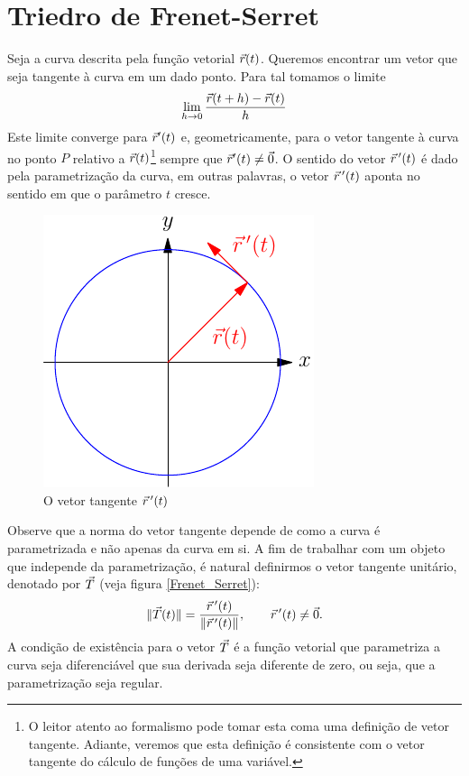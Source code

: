 \section{Triedro de Frenet-Serret}

Seja a curva descrita pela função vetorial $\vec{r}(t)$. Queremos encontrar um vetor que seja tangente à curva em um dado ponto. Para tal tomamos o limite
$$\lim_{h\to 0} \frac{\vec{r}(t+h)-\vec{r}(t)}{h}$$  
Este limite converge para $\vec{r}'(t)$ e, geometricamente, para o vetor tangente à curva no ponto $P$ relativo a $\vec{r}(t)$\footnote{O leitor atento ao formalismo pode tomar esta coma uma definição de vetor tangente. Adiante, veremos que esta definição é consistente com o vetor tangente do cálculo de funções de uma variável.} sempre que $\vec{r}'(t)\neq \vec{0}$. O sentido do vetor $\vec{r}~\!'(t)$ é dado pela parametrização da curva, em outras palavras, o vetor $\vec{r}~\!'(t)$ aponta no sentido em que o parâmetro $t$ cresce.


\begin{figure}%
\begin{center}
    \includegraphics{./cap_curvas/pics/vetor_tangente_circunferencia}
\caption{O vetor tangente $\vec{r}\!~'(t)$}\label{circtang}
  \end{center}
\end{figure}


Observe que a norma do vetor tangente depende de como a curva é parametrizada e não apenas da curva em si. A fim de trabalhar com um objeto que independe da parametrização, é natural definirmos o vetor tangente unitário, denotado por $\vec{T}$ (veja figura \ref{Frenet_Serret}):
\begin{equation}\label{defvecunit}
\|\vec{T}(t)\|=\frac{\vec{r}\!~'(t)}{\left\|\vec{r}\!~'(t)\right\|},\qquad \vec{r}\!~'(t)\neq \vec{0}.
\end{equation} 
A condição de existência para o vetor $\vec{T}$ é a função vetorial que parametriza a curva seja diferenciável que sua derivada seja diferente de zero, ou seja, que a parametrização seja regular.

